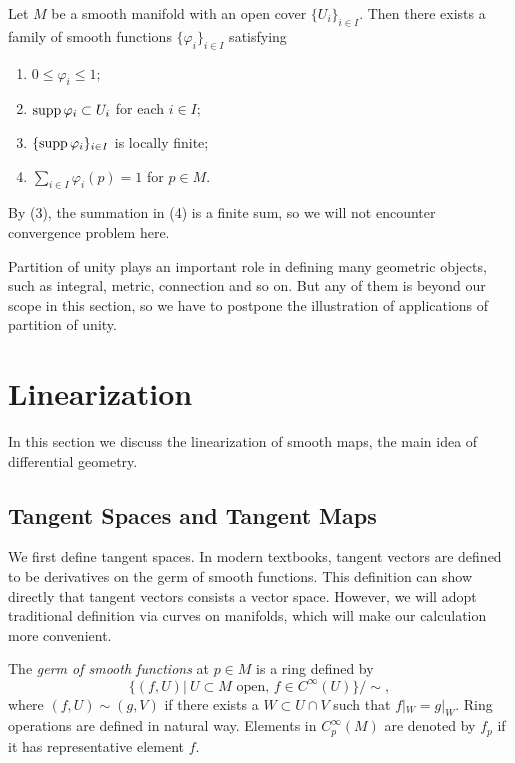 \begin{thm}
    Let $M$ be a smooth manifold with an open cover $\{U_i\}_{i\in I}$.
    Then there exists a family of smooth functions $\{\varphi_i\}_{i\in I}$ satisfying
    \begin{enumerate}[(1)]
        \item $0\leq\varphi_i\leq 1$;
        \item $\operatorname{supp}\varphi_i\subset U_i$ for each $i\in I$;
        \item $\{\operatorname{supp}\varphi_i\}_{i\in I}$ is locally finite;
        \item $\sum_{i\in I}\varphi_i(p)=1$ for $p\in M$.
    \end{enumerate}
\end{thm}

\begin{rem}
    By (3), the summation in (4) is a finite sum, so we will not encounter convergence problem here.
\end{rem}

Partition of unity plays an important role in defining many geometric objects, such as integral, metric, connection and so on.
But any of them is beyond our scope in this section, so we have to postpone the illustration of applications of partition of unity.

\section{Linearization}
In this section we discuss the linearization of smooth maps, the main idea of differential geometry.

\subsection*{Tangent Spaces and Tangent Maps}

We first define tangent spaces.
In modern textbooks, tangent vectors are defined to be derivatives on the germ of smooth functions.
This definition can show directly that tangent vectors consists a vector space.
However, we will adopt traditional definition via curves on manifolds, which will make our calculation more convenient.

\begin{defn}
    The \emph{germ of smooth functions} at $p\in M$ is a ring defined by
    \[\{(f,U)|\ U\subset M\text{ open, }f\in C^\infty(U)\}/\sim,\]
    where $(f,U)\sim(g,V)$ if there exists a $W\subset U\cap V$ such that $f|_W=g|_W$.
    Ring operations are defined in natural way.
    Elements in $C^\infty_p(M)$ are denoted by $f_p$ if it has representative element $f$.
\end{defn}


